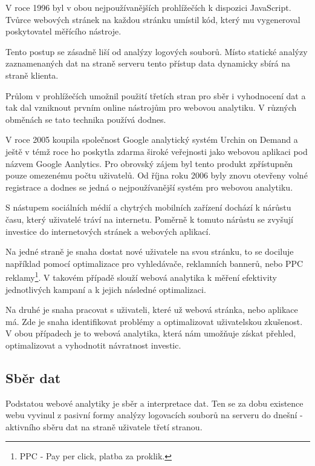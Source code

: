 \documentclass[bc,male,java,dept456]{diploma}						%
\begin{document}
V roce 1996 byl v obou nejpoužívanějších prohlížečích\cite{browser_market_share} k dispozici JavaScript. Tvůrce webových stránek na každou stránku umístil kód, který mu vygeneroval poskytovatel měřícího nástroje. 

Tento postup se zásadně liší od analýzy logových souborů. Místo statické analýzy zaznamenaných dat na straně serveru tento přístup data dynamicky sbírá na straně klienta.

Průlom v prohlížečích umožnil použití třetích stran pro sběr i vyhodnocení dat a tak dal vzniknout prvním online nástrojům pro webovou analytiku. V různých obměnách se tato technika používá dodnes.

V roce 2005 koupila\cite{urchin} společnost Google analytický systém Urchin on Demand a ještě v témž roce ho poskytla zdarma široké veřejnosti jako webovou aplikaci pod názvem Google Aanlytics. Pro obrovský zájem byl tento produkt zpřístupněn pouze omezenému počtu uživatelů. Od října roku 2006 byly znovu otevřeny volné registrace a dodnes se jedná o nejpoužívanější systém pro webovou analytiku.

S nástupem sociálních médií a chytrých mobilních zařízení dochází k nárůstu času, který uživatelé tráví na internetu. Poměrně k tomuto nárůstu se zvyšují investice do internetových stránek a webových aplikací. 

Na jedné straně je snaha dostat nové uživatele na svou stránku, to se dociluje na\-pří\-klad pomocí optimalizace pro vyhledávače, reklamních bannerů, nebo PPC reklamy\footnote{PPC - Pay per click, platba za proklik.}. V ta\-ko\-vém případě slouží webová analytika k měření efektivity jednotlivých kampaní a k jejich následné optimalizaci.

Na druhé je snaha pracovat s uživateli, které už webová stránka, nebo aplikace má. Zde je snaha identifikovat problémy a optimalizovat uživatelskou zkušenost. V obou případech je to webová analytika, která nám umožňuje získat přehled, optimalizovat a vyhodnotit návratnost investic.










\subsection{Sběr dat}

Podstatou webové analytiky je sběr a interpretace dat. Ten se za dobu existence webu vyvinul z pasivní formy analýzy logovacích souborů na serveru do dnešní - aktivního sběru dat na straně uživatele třetí stranou.
\end{document}

